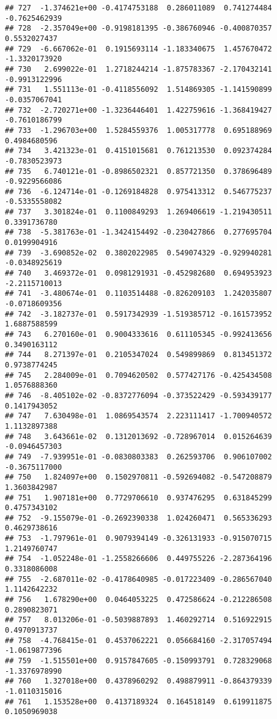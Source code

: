 \documentclass[
]{article}
\begin{document}
\begin{verbatim}
## 727  -1.374621e+00 -0.4174753188  0.286011089  0.741274484 -0.7625462939
## 728  -2.357049e+00 -0.9198181395 -0.386760946 -0.400870357  0.5532027437
## 729  -6.667062e-01  0.1915693114 -1.183340675  1.457670472 -1.3320173920
## 730   2.699022e-01  1.2718244214 -1.875783367 -2.170432141 -0.9913122996
## 731   1.551113e-01 -0.4118556092  1.514869305 -1.141590899 -0.0357067041
## 732  -2.720271e+00 -1.3236446401  1.422759616 -1.368419427 -0.7610186799
## 733  -1.296703e+00  1.5284559376  1.005317778  0.695188969  0.4984680596
## 734   3.421323e-01  0.4151015681  0.761213530  0.092374284 -0.7830523973
## 735   6.740121e-01 -0.8986502321  0.857721350  0.378696489 -0.9229566086
## 736  -6.124714e-01 -0.1269184828  0.975413312  0.546775237 -0.5335558082
## 737   3.301824e-01  0.1100849293  1.269406619 -1.219430511  0.3391736780
## 738  -5.381763e-01 -1.3424154492 -0.230427866  0.277695704  0.0199904916
## 739  -3.690852e-02  0.3802022985  0.549074329 -0.929940281 -0.0348925619
## 740   3.469372e-01  0.0981291931 -0.452982680  0.694953923 -2.2115710013
## 741  -3.480674e-01  0.1103514488 -0.826209103  1.242035807 -0.0718609356
## 742  -3.182737e-01  0.5917342939 -1.519385712 -0.161573952  1.6887588599
## 743   6.270160e-01  0.9004333616  0.611105345 -0.992413656  0.3490163112
## 744   8.271397e-01  0.2105347024  0.549899869  0.813451372  0.9738774245
## 745   2.284009e-01  0.7094620502  0.577427176 -0.425434508  1.0576888360
## 746  -8.405102e-02 -0.8372776094 -0.373522429 -0.593439177  0.1417943052
## 747   7.630498e-01  1.0869543574  2.223111417 -1.700940572  1.1132897388
## 748   3.643661e-02  0.1312013692 -0.728967014  0.015264639 -0.0946457303
## 749  -7.939951e-01 -0.0830803383  0.262593706  0.906107002 -0.3675117000
## 750   1.824097e+00  0.1502970811 -0.592694082 -0.547208879  1.3603842987
## 751   1.907181e+00  0.7729706610  0.937476295  0.631845299  0.4757343102
## 752  -9.155079e-01 -0.2692390338  1.024260471  0.565336293  0.4629738616
## 753  -1.797961e-01  0.9079394149 -0.326131933 -0.915070715  1.2149760747
## 754  -1.052248e-01 -1.2558266606  0.449755226 -2.287364196  0.3318086008
## 755  -2.687011e-02 -0.4178640985 -0.017223409 -0.286567040  1.1142642232
## 756   1.678290e+00  0.0464053225  0.472586624 -0.212286508  0.2890823071
## 757   8.013206e-01 -0.5039887893  1.460292714  0.516922915  0.4970913737
## 758  -4.768415e-01  0.4537062221  0.056684160 -2.317057494 -1.0619877396
## 759  -1.515501e+00  0.9157847605 -0.150993791  0.728329068 -1.3376978990
## 760   1.327018e+00  0.4378960292  0.498879911 -0.864379339 -1.0110315016
## 761   1.153528e+00  0.4137189324  0.164518149  0.619911875  0.1050969038

\end{verbatim}
\end{document}
